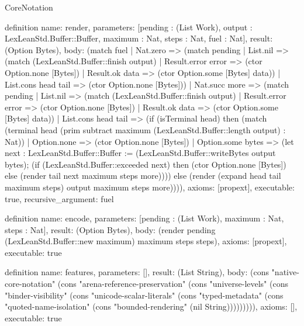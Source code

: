 \begin{lexlean}{CoreNotation}
\begin{semanticmodule}
definition{
 name: render,
 parameters: [pending : (List Work), output : LexLeanStd.Buffer::Buffer, maximum : Nat, steps : Nat, fuel : Nat],
 result: (Option Bytes),
 body: (match fuel | Nat.zero => (match pending | List.nil => (match (LexLeanStd.Buffer::finish output) | Result.error error => (ctor Option.none [Bytes]) | Result.ok data => (ctor Option.some [Bytes] data)) | List.cons head tail => (ctor Option.none [Bytes])) | Nat.succ more => (match pending | List.nil => (match (LexLeanStd.Buffer::finish output) | Result.error error => (ctor Option.none [Bytes]) | Result.ok data => (ctor Option.some [Bytes] data)) | List.cons head tail => (if (isTerminal head) then (match (terminal head (prim subtract maximum (LexLeanStd.Buffer::length output) : Nat)) | Option.none => (ctor Option.none [Bytes]) | Option.some bytes => (let next : LexLeanStd.Buffer::Buffer := (LexLeanStd.Buffer::writeBytes output bytes); (if (LexLeanStd.Buffer::exceeded next) then (ctor Option.none [Bytes]) else (render tail next maximum steps more)))) else (render (expand head tail maximum steps) output maximum steps more)))),
 axioms: [propext],
 executable: true,
 recursive_argument: fuel
}

definition{
 name: encode,
 parameters: [pending : (List Work), maximum : Nat, steps : Nat],
 result: (Option Bytes),
 body: (render pending (LexLeanStd.Buffer::new maximum) maximum steps steps),
 axioms: [propext],
 executable: true
}

definition{
 name: features,
 parameters: [],
 result: (List String),
 body: (cons "native-core-notation" (cons "arena-reference-preservation" (cons "universe-levels" (cons "binder-visibility" (cons "unicode-scalar-literals" (cons "typed-metadata" (cons "quoted-name-isolation" (cons "bounded-rendering" (nil String))))))))),
 axioms: [],
 executable: true
}

\end{semanticmodule}
\end{lexlean}
